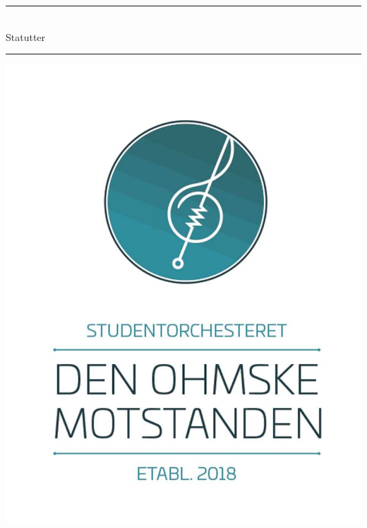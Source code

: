 \documentclass{article}
\begin{document}
%

    \thispagestyle{empty}
        \hfill
        \begin{minipage}{\linewidth}
            \vfill
            \begin{center}
                \rule{\linewidth}{0.1em}\\
                \vspace{0.6\baselineskip}
                {\Huge Statutter}
                \rule{\linewidth}{0.1em}
            \end{center}
            \begin{minipage}{\linewidth}
                \includegraphics[width = \linewidth]{images/MotstandenLogo.jpg}
            \end{minipage}
        \end{minipage}
    \newpage
    
    \tableofcontents
    \newpage
\end{document}
